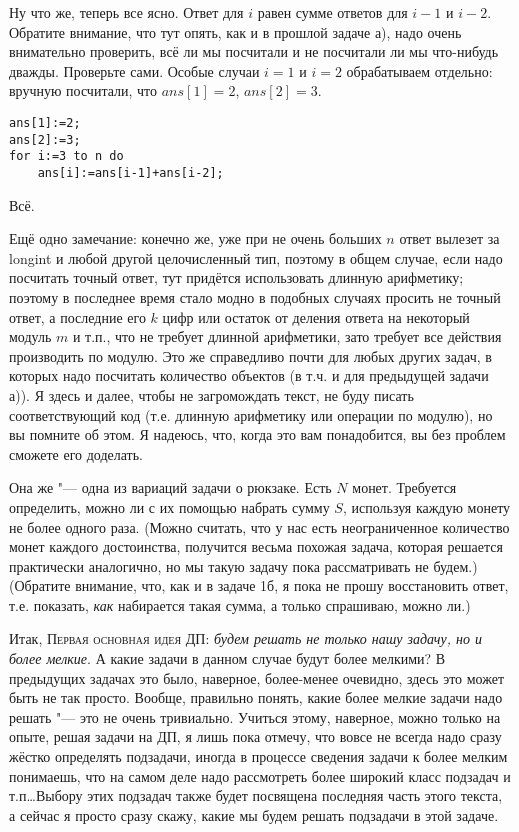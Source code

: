 Ну что же, теперь все ясно. Ответ для $i$ равен сумме ответов для $i-1$ и $i-2$. {\footnotesize 
Обратите внимание, что тут опять, как и в прошлой задаче а), надо очень внимательно проверить, всё 
ли мы посчитали и не посчитали ли мы что-нибудь дважды. Проверьте сами.} Особые случаи $i=1$ и $i=2$ 
обрабатываем отдельно: вручную посчитали, что $ans[1]=2$, $ans[2]=3$.
\begin{codesampleo}\begin{verbatim}
ans[1]:=2;
ans[2]:=3;
for i:=3 to n do
    ans[i]:=ans[i-1]+ans[i-2];
\end{verbatim}
\end{codesampleo}
Всё.

Ещё одно замечание: конечно же, уже при не очень больших $n$ ответ вылезет за longint и любой 
другой целочисленный тип, поэтому в общем случае, если надо посчитать точный ответ, тут придётся 
использовать длинную арифметику; поэтому в последнее время стало 
модно в подобных случаях просить не точный ответ, а последние его $k$ цифр или остаток от деления 
ответа на некоторый модуль $m$ и т.п., что не требует длинной арифметики, зато требует все действия 
производить по модулю. Это же справедливо почти для любых других задач, в которых надо 
посчитать количество объектов (в т.ч. и для предыдущей задачи а)). Я здесь и далее, чтобы не 
загромождать текст, не буду писать соответствующий код (т.е. длинную арифметику или операции по модулю), 
но вы помните об этом. Я надеюсь, что, когда это вам понадобится, вы без проблем сможете его 
доделать.

\label{coins}
Она же "--- одна из вариаций задачи о 
рюкзаке. Есть $N$ монет. Требуется определить, можно ли с их помощью набрать сумму $S$, используя 
каждую монету не более одного раза.  (Можно считать, что у нас есть неограниченное количество монет 
каждого достоинства, получится весьма похожая задача, которая решается практически аналогично, но 
мы такую задачу пока рассматривать не будем.) (Обратите внимание, что, как и в задаче 1б, я пока не 
прошу восстановить ответ, т.е. показать, \textit{как} набирается такая сумма, а только спрашиваю, 
можно ли.)

Итак, \textsc{Первая основная идея ДП:} \textit{будем решать не только нашу задачу, но и более мелкие}. А 
какие задачи в данном случае будут более мелкими? В предыдущих задачах это было, наверное, 
более-менее очевидно, здесь это может быть не так просто. Вообще, правильно 
понять, какие более мелкие задачи надо решать "--- это не очень тривиально. Учиться этому, 
наверное, можно только на опыте, решая задачи на ДП, я лишь пока отмечу, что вовсе не всегда надо 
сразу жёстко определять подзадачи, иногда в процессе сведения задачи к более мелким понимаешь, что 
на самом деле надо рассмотреть более широкий класс подзадач и т.п\dots Выбору этих подзадач также 
будет посвящена последняя часть этого текста, а сейчас я просто сразу скажу, какие мы будем решать 
подзадачи в этой задаче.

